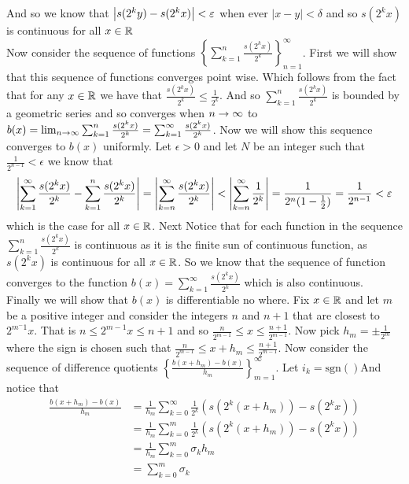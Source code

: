 \documentclass[12pt]{amsart}
\begin{document}
\begin{itemize}
      And so we know that $\left\vert s(2^ky)-s(2^kx) \right\vert<\varepsilon$ when ever $|x-y|<\delta$
      and so $s(2^kx)$ is continuous for all $x\in \mathbb{R}$\\

      Now consider the sequence of functions
      $\displaystyle{\left\{\sum_{k=1}^n\frac{s(2^kx)}{2^k}\right\}_{n=1}^{\infty}}$.
      First we will show that this sequence of functions converges point wise. 
      Which follows from the fact that for any $x\in \mathbb{R}$ we have that 
      $\frac{s(2^kx)}{2^k}\leq \frac{1}{2^k}$. And so $\sum_{k=1}^n\frac{s(2^kx)}{2^k}$ 
      is bounded by a geometric series and so converges when $n\rightarrow\infty$ to 
      $b(x)=\lim_{n\rightarrow\infty}\sum_{k=1}^n\frac{s(2^kx)}{2^k}=\sum_{k=1}^\infty\frac{s(2^kx)}{2^k}$. 
      Now we will show this sequence converges to $b(x)$ uniformly. Let
      $\epsilon>0$ and let $N$ be an integer such that $\frac{1}{2^{n-1}}<\epsilon$
      we know that
      \[\left\vert \sum_{k=1}^\infty\frac{s(2^kx)}{2^k}-\sum_{k=1}^n\frac{s(2^kx)}{2^k} \right\vert=\left\vert \sum_{k=n}^\infty\frac{s(2^kx)}{2^k} \right\vert<\left\vert \sum_{k=n}^\infty\frac{1}{2^k} \right\vert=\frac{1}{2^n(1-\frac{1}{2})}=\frac{1}{2^{n-1}}<\varepsilon\]
      which is the case for all $x\in\mathbb{R}$. Next Notice that for each function in the
      sequence $\sum_{k=1}^n\frac{s(2^kx)}{2^k}$ is continuous as it is the finite
      sun of continuous function, as $s(2^kx)$ is continuous for all $x\in\mathbb{R}$. So we
      know that the sequence of function converges to the function
      $b(x)=\sum_{k=1}^\infty\frac{s(2^kx)}{2^k}$ which is also continuous.\\

      Finally we will show that $b(x)$ is differentiable no where.
      Fix $x\in \mathbb{R}$ and let $m$ be a positive integer and consider the integers $n$ and $n+1$ that are closest to $2^{m^-1}x$. 
      That is $n\leq 2^{m-1}x\leq n+1$ and so $\frac{n}{2^{m-1}}\leq x\leq \frac{n+1}{2^{m-1}}$. Now pick $h_m=\pm\frac{1}{2^m}$ 
      where the sign is chosen such that $\frac{n}{2^{m-1}}\leq x+h_m\leq \frac{n+1}{2^{m-1}}$.
      Now consider the sequence of difference quotients $\left\{\frac{b(x+h_m)-b(x)}{h_m}\right\}_{m=1}^\infty$. Let $i_k=\text{sgn}()$And notice that 
      \begin{align}
         \frac{b(x+h_m)-b(x)}{h_m}&=\frac{1}{h_m}\sum_{k=0}^{\infty}\frac{1}{2^k}\left(s(2^k(x+h_m))-s(2^kx)\right)\\
         &=\frac{1}{h_m}\sum_{k=0}^{m}\frac{1}{2^k}\left(s(2^k(x+h_m))-s(2^kx)\right)\\
         &=\frac{1}{h_m}\sum_{k=0}^{m}\sigma_k h_m\\
         &=\sum_{k=0}^{m}\sigma_k
      \end{align}



\end{itemize}
\end{document}
